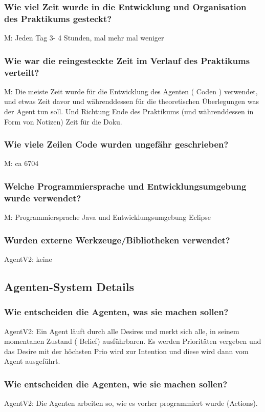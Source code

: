 \documentclass[runningheads]{llncs}
\begin{document}
\subsubsection{Wie viel Zeit wurde in die Entwicklung und Organisation des Praktikums gesteckt?\\}
M: Jeden Tag 3- 4 Stunden, mal mehr mal weniger
\subsubsection{Wie war die reingesteckte Zeit im Verlauf des Praktikums verteilt?\\}
M: Die meiste Zeit wurde für die Entwicklung des Agenten ( Coden ) verwendet, und etwas Zeit davor und währenddessen für die theoretischen Überlegungen was der Agent tun soll. Und Richtung Ende des Praktikums (und währenddessen in Form von Notizen) Zeit für die Doku. 
\subsubsection{Wie viele Zeilen Code wurden ungefähr geschrieben?\\}
M: ca 6704
\subsubsection{Welche Programmiersprache und Entwicklungsumgebung wurde verwendet?\\}
M: Programmiersprache Java und Entwicklungsumgebung Eclipse
\subsubsection{Wurden externe Werkzeuge/Bibliotheken verwendet?\\}
AgentV2: keine
\subsection{Agenten-System Details}
\subsubsection{Wie entscheiden die Agenten, was sie machen sollen?\\}
AgentV2: Ein Agent läuft durch alle Desires und merkt sich alle, in seinem momentanen Zustand ( Belief) ausführbaren. Es werden Prioritäten vergeben und das Desire mit der höchsten Prio wird zur Intention und diese wird dann vom Agent ausgeführt.
\subsubsection{Wie entscheiden die Agenten, wie sie machen sollen?\\}
AgentV2: Die Agenten arbeiten so, wie es vorher programmiert wurde (Actions). 
\end{document}
